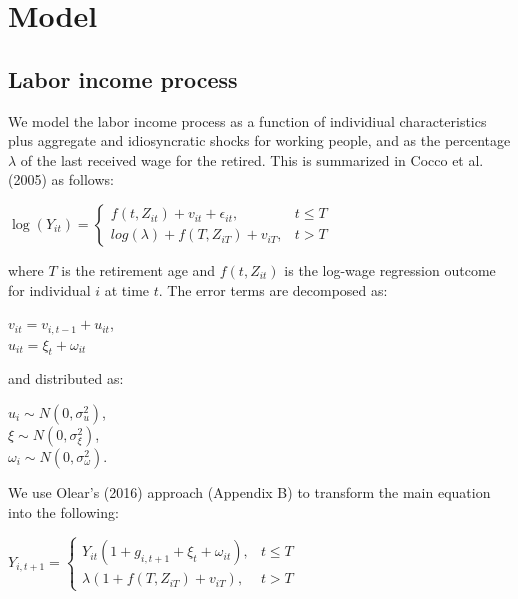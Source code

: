 \documentclass[]{article}
\begin{document}
\section{Model}
\label{model}

\subsection{Labor income process}

We model the labor income process as a function of individiual characteristics plus aggregate and idiosyncratic shocks for working people, and as the percentage $\lambda$ of the last received wage for the retired. This is summarized in Cocco et al. (2005) as follows:

\begin{center}
	$\log(Y_{it}) =
		\begin{cases}
			f(t,Z_{it}) + v_{it} + \epsilon_{it}, & t \leq T \\
			log(\lambda) + f(T, Z_{iT}) + v_{iT}, & t > T
		\end{cases}
	$
\end{center}

where $T$ is the retirement age and $f(t, Z_{it})$ is the log-wage regression outcome for individual $i$ at time $t$. The error terms are decomposed as:

\begin{center}
	$v_{it} = v_{i,t-1} + u_{it}$,\\
	$u_{it} = \xi_t + \omega_{it}$
\end{center}

and distributed as:

\begin{center}
	$u_{i} \sim N(0, \sigma^2_u)$,\\
	$\xi \sim N(0,\sigma^2_{\xi})$,\\
	$\omega_{i} \sim N(0, \sigma^2_{\omega})$.
\end{center}

We use Olear's (2016) approach (Appendix B) to transform the main equation into the following:

\begin{center}
	$Y_{i,t+1} = 
	\begin{cases}
		Y_{it} (1 + g_{i,t+1} + \xi_t + \omega_{it}), & t \leq T \\
		\lambda (1 + f(T, Z_{iT}) + v_{iT}), & t > T
	\end{cases}	
	$
\end{center}
\end{document}

